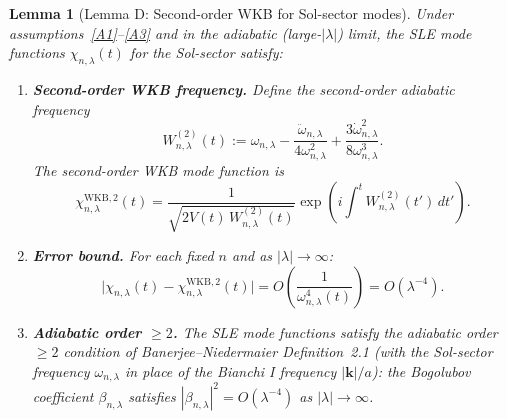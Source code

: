 \documentclass[11pt,a4paper]{article}
\newtheorem{lemma}[theorem]{Lemma}
\theoremstyle{definition}
\begin{document}
\begin{lemma}[Lemma D: Second-order WKB for Sol-sector modes]\label{lem:D}
Under assumptions~\ref{A1}--\ref{A3} and in the adiabatic (large-$|\lambda|$) limit,
the SLE mode functions $\chi_{n,\lambda}(t)$ for the Sol-sector satisfy:
\begin{enumerate}[label=(\alph*)]
\item \textbf{Second-order WKB frequency.}
  Define the second-order adiabatic frequency
  \begin{equation}\label{eq:W2}
    W_{n,\lambda}^{(2)}(t) := \omega_{n,\lambda}
    - \frac{\ddot\omega_{n,\lambda}}{4\omega_{n,\lambda}^2}
    + \frac{3\dot\omega_{n,\lambda}^2}{8\omega_{n,\lambda}^3}.
  \end{equation}
  The second-order WKB mode function is
  \begin{equation}\label{eq:WKBmode}
    \chi_{n,\lambda}^{\mathrm{WKB},2}(t)
    = \frac{1}{\sqrt{2V(t)\,W_{n,\lambda}^{(2)}(t)}}
      \exp\!\left(i\int^t W_{n,\lambda}^{(2)}(t')\,dt'\right).
  \end{equation}
\item \textbf{Error bound.}
  For each fixed $n$ and as $|\lambda| \to \infty$:
  \begin{equation}\label{eq:WKBerror}
    \bigl|\chi_{n,\lambda}(t) - \chi_{n,\lambda}^{\mathrm{WKB},2}(t)\bigr|
    = O\!\left(\frac{1}{\omega_{n,\lambda}^4(t)}\right)
    = O\!\left(\lambda^{-4}\right).
  \end{equation}
\item \textbf{Adiabatic order $\geq 2$.}
  The SLE mode functions satisfy the adiabatic order~$\geq 2$ condition of
  Banerjee--Niedermaier \cite{BN23} Definition~2.1 (with the Sol-sector frequency
  $\omega_{n,\lambda}$ in place of the Bianchi I frequency $|\mathbf{k}|/a$):
  the Bogolubov coefficient $\beta_{n,\lambda}$ satisfies
  $|\beta_{n,\lambda}|^2 = O(\lambda^{-4})$ as $|\lambda| \to \infty$.
\end{enumerate}
\end{lemma}
\end{document}
